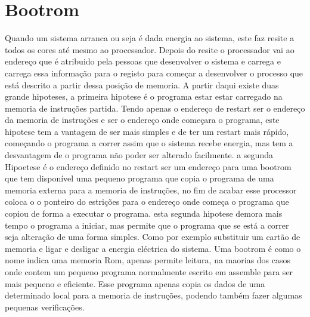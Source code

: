 
\chapter{Bootrom}
\label{chapter:Bootrom}

Quando um sistema arranca ou seja é dada energia ao sistema, este faz resite a todos os cores até mesmo ao processador. Depois do resite o processador vai ao endereço que é atribuido pela pessoas que desenvolver o sistema e carrega e carrega essa informação para o registo para começar a desenvolver o processo que está descrito a partir dessa posição de memoria. A partir daqui existe duas grande hipoteses, a primeira hipotese é o programa estar estar carregado na memoria de instruções partida. Tendo apenas o endereço de restart ser o endereço da memoria de instruções e ser o endereço onde começara o programa, este hipotese tem a vantagem de ser mais simples e de ter um restart mais rápido, começando o programa a correr assim que o sistema recebe energia, mas tem a desvantagem de o programa não poder ser alterado facilmente. a segunda Hipoetese é o endereço definido no restart ser um endereço para uma bootrom que tem disponível uma pequeno programa que copia o programa de uma memoria externa para a memoria de instruções, no fim de acabar esse processor coloca o o ponteiro do estrições para o endereço onde começa o programa que copiou de forma a executar o programa. esta segunda hipotese demora mais tempo o programa a iniciar, mas permite que o programa que se está a correr seja alteração de uma forma simples. Como por exemplo substituir um cartão de memoria e ligar e desligar a energia eléctrica do sistema. Uma bootrom é como o nome indica uma memoria Rom, apenas permite leitura, na maorias dos casos onde contem um pequeno programa normalmente escrito em assemble para ser mais pequeno e eficiente. Esse programa apenas copia os dados de uma determinado local para a memoria de instruções, podendo também fazer algumas pequenas verificações.

